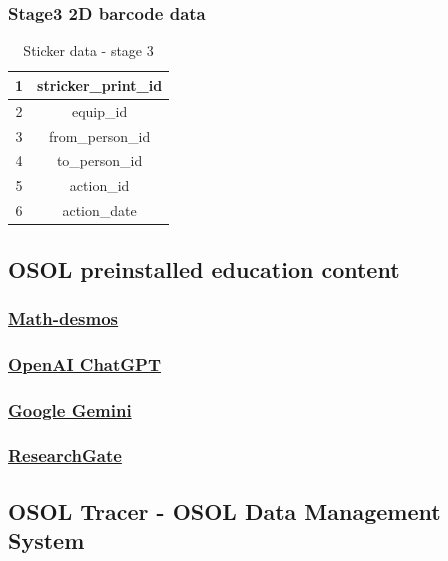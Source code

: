 \documentclass[a4paper,11pt]{article}
\begin{document}
\subsubsection {Stage3 2D barcode data}
\begin{table}[h!]
	\begin{center}
		\begin{tabular}{ | c | c | }
			\hline
			1 & stricker\_print\_id \\ 
			\hline
			2 & equip\_id  \\  
			\hline
			3 & from\_person\_id \\
			\hline
			4 & to\_person\_id \\ 
			\hline
			5 &  action\_id \\  
			\hline
			6 & action\_date \\
			\hline
		\end{tabular}
		\caption{Sticker data \-- stage 3}
		\label{table:sticker_data_stage_3}
	\end{center}
\end{table}


\subsection{OSOL preinstalled education content}
\subsubsection{\href{https://www.desmos.com/}{Math-desmos}}

\subsubsection{\href{https://chatgpt.com/}{OpenAI ChatGPT}}

\subsubsection{\href{https://gemini.google.com/}{Google Gemini}}

\subsubsection{\href{https://www.researchgate.net/}{ResearchGate}}


	
\subsection{OSOL Tracer - OSOL Data Management System}
\end{document}
